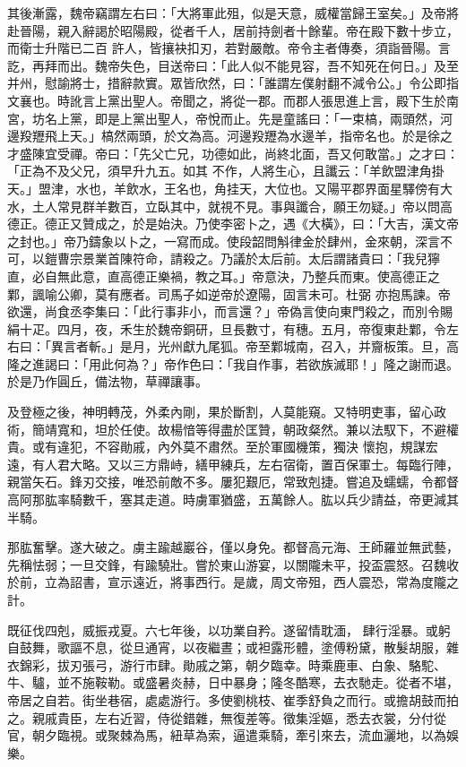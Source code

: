 \begin{pinyinscope}
 其後漸露，魏帝竊謂左右曰：「大將軍此殂，似是天意，威權當歸王室矣。」及帝將赴晉陽，親入辭謁於昭陽殿，從者千人，居前持劍者十餘輩。帝在殿下數十步立，而衛士升階已二百
 許人，皆攘袂扣刃，若對嚴敵。帝令主者傳奏，須詣晉陽。言訖，再拜而出。魏帝失色，目送帝曰：「此人似不能見容，吾不知死在何日。」及至并州，慰諭將士，措辭款實。眾皆欣然，曰：「誰謂左僕射翻不減令公。」令公即指文襄也。時訛言上黨出聖人。帝聞之，將從一郡。而郡人張思進上言，殿下生於南宮，坊名上黨，即是上黨出聖人，帝悅而止。先是童謠曰：「一束槁，兩頭然，河邊羖䍽飛上天。」槁然兩頭，於文為高。河邊羖䍽為水邊羊，指帝名也。於是徐之才盛陳宜受禪。帝曰：「先父亡兄，功德如此，尚終北面，吾又何敢當。」之才曰：「正為不及父兄，須早升九五。如其
 不作，人將生心，且讖云：「羊飲盟津角掛天。」盟津，水也，羊飲水，王名也，角挂天，大位也。又陽平郡界面星驛傍有大水，土人常見群羊數百，立臥其中，就視不見。事與讖合，願王勿疑。」帝以問高德正。德正又贊成之，於是始決。乃使李密卜之，遇《大橫》，曰：「大吉，漢文帝之封也。」帝乃鑄象以卜之，一寫而成。使段韶問斛律金於肆州，金來朝，深言不可，以鎧曹宗景業首陳符命，請殺之。乃議於太后前。太后謂諸貴曰：「我兒獰直，必自無此意，直高德正樂禍，教之耳。」帝意決，乃整兵而東。使高德正之鄴，諷喻公卿，莫有應者。司馬子如逆帝於遼陽，固言未可。杜弼
 亦抱馬諫。帝欲還，尚食丞李集曰：「此行事非小，而言還？」帝偽言使向東門殺之，而別令賜絹十疋。四月，夜，禾生於魏帝銅研，旦長數寸，有穗。五月，帝復東赴鄴，令左右曰：「異言者斬。」是月，光州獻九尾狐。帝至鄴城南，召入，并齎板策。旦，高隆之進謁曰：「用此何為？」帝作色曰：「我自作事，若欲族滅耶！」隆之謝而退。於是乃作圓丘，備法物，草禪讓事。



 及登極之後，神明轉茂，外柔內剛，果於斷割，人莫能窺。又特明吏事，留心政術，簡靖寬和，坦於任使。故楊愔等得盡於匡贊，朝政粲然。兼以法馭下，不避權貴。或有違犯，不容勛戚，內外莫不肅然。至於軍國機策，獨決
 懷抱，規謀宏遠，有人君大略。又以三方鼎峙，繕甲練兵，左右宿衛，置百保軍士。每臨行陣，親當矢石。鋒刃交接，唯恐前敵不多。屢犯艱厄，常致剋捷。嘗追及蠕蠕，令都督高阿那肱率騎數千，塞其走道。時虜軍猶盛，五萬餘人。肱以兵少請益，帝更減其半騎。



 那肱奮擊。遂大破之。虜主踰越巖谷，僅以身免。都督高元海、王師羅並無武藝，先稱怯弱；一旦交鋒，有踰驍壯。嘗於東山游宴，以關隴未平，投盃震怒。召魏收於前，立為詔書，宣示遠近，將事西行。是歲，周文帝殂，西人震恐，常為度隴之計。



 既征伐四剋，威振戎夏。六七年後，以功業自矜。遂留情耽湎，
 肆行淫暴。或躬自鼓舞，歌謳不息，從旦通宵，以夜繼晝；或袒露形體，塗傅粉黛，散髮胡服，雜衣錦彩，拔刃張弓，游行市肆。勛戚之第，朝夕臨幸。時乘鹿車、白象、駱駝、牛、驢，並不施鞍勒。或盛暑炎赫，日中暴身；隆冬酷寒，去衣馳走。從者不堪，帝居之自若。街坐巷宿，處處游行。多使劉桃枝、崔季舒負之而行。或擔胡鼓而拍之。親戚貴臣，左右近習，侍從錯雜，無復差等。徵集淫嫗，悉去衣裳，分付從官，朝夕臨視。或聚棘為馬，紐草為索，逼遣乘騎，牽引來去，流血灑地，以為娛樂。




\end{pinyinscope}

